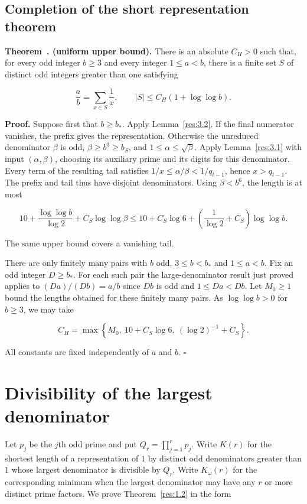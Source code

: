 \documentclass[11pt,a4paper]{article}
\newcounter{result}[section]
\renewcommand{\theresult}{\thesection.\arabic{result}}
\newcommand{\paperstatement}[3]{%
  \refstepcounter{result}\label{res:#2}%
  \noindent\textbf{#1~\theresult#3.}\enspace\ignorespaces}
\begin{document}
\subsection{Completion of the short representation theorem}

\paperstatement{Theorem}{3.3}{ (uniform upper bound)} There is an absolute $C_H>0$ such that, for every odd integer $b\ge3$ and every integer $1\le a<b$, there is a finite set $S$ of distinct odd integers greater than one satisfying

\[
\frac ab=\sum_{x\in S}\frac1x,
 \qquad |S|\le C_H(1+\log\log b).
\]

\textbf{Proof.} Suppose first that $b\ge b_*$. Apply Lemma~\ref{res:3.2}. If the final numerator vanishes, the prefix gives the representation. Otherwise the unreduced denominator $\beta$ is odd, $\beta\ge b^3\ge b_S$, and $1\le\alpha\le\sqrt\beta$. Apply Lemma~\ref{res:3.1} with input $(\alpha,\beta)$, choosing its auxiliary prime and its digits for this denominator. Every term of the resulting tail satisfies $1/x\le\alpha/\beta<1/q_{t-1}$, hence $x>q_{t-1}$. The prefix and tail thus have disjoint denominators. Using $\beta<b^6$, the length is at most

\[
10+\frac{\log\log b}{\log 2}+C_S\log\log\beta
 \le 10+C_S\log 6+\left(\frac1{\log 2}+C_S\right)\log\log b.
\]

The same upper bound covers a vanishing tail.

There are only finitely many pairs with $b$ odd, $3\le b<b_*$ and $1\le a<b$. Fix an odd integer $D\ge b_*$. For each such pair the large-denominator result just proved applies to $(Da)/(Db)=a/b$ since $Db$ is odd and $1\le Da<Db$. Let $M_0\ge1$ bound the lengths obtained for these finitely many pairs. As $\log\log b>0$ for $b\ge3$, we may take

\[
C_H=\max\left\{M_0,\ 10+C_S\log 6,\ (\log 2)^{-1}+C_S\right\}.
\]

All constants are fixed independently of $a$ and $b$. $\square$

\section{Divisibility of the largest denominator}

Let $p_j$ be the $j$th odd prime and put $Q_r=\prod_{j=1}^r p_j$. Write $K(r)$ for the shortest length of a representation of $1$ by distinct odd denominators greater than $1$ whose largest denominator is divisible by $Q_r$. Write $K_\omega(r)$ for the corresponding minimum when the largest denominator may have any $r$ or more distinct prime factors. We prove Theorem~\ref{res:1.2} in the form
\end{document}
